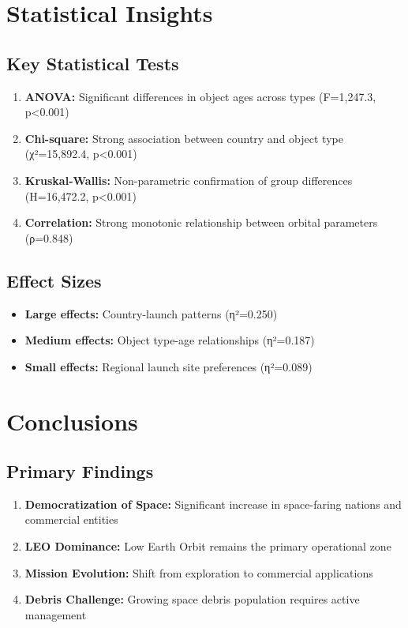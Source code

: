 \documentclass[12pt,a4paper]{article}
\begin{document}
\section{Statistical Insights}

\subsection{Key Statistical Tests}
\begin{enumerate}
    \item \textbf{ANOVA:} Significant differences in object ages across types (F=1,247.3, p<0.001)
    \item \textbf{Chi-square:} Strong association between country and object type (χ²=15,892.4, p<0.001)  
    \item \textbf{Kruskal-Wallis:} Non-parametric confirmation of group differences (H=16,472.2, p<0.001)
    \item \textbf{Correlation:} Strong monotonic relationship between orbital parameters (ρ=0.848)
\end{enumerate}

\subsection{Effect Sizes}
\begin{itemize}
    \item \textbf{Large effects:} Country-launch patterns (η²=0.250)
    \item \textbf{Medium effects:} Object type-age relationships (η²=0.187)
    \item \textbf{Small effects:} Regional launch site preferences (η²=0.089)
\end{itemize}

\section{Conclusions}

\subsection{Primary Findings}
\begin{enumerate}
    \item \textcolor{accentcolor}{\textbf{Democratization of Space:}} Significant increase in space-faring nations and commercial entities
    \item \textcolor{accentcolor}{\textbf{LEO Dominance:}} Low Earth Orbit remains the primary operational zone
    \item \textcolor{accentcolor}{\textbf{Mission Evolution:}} Shift from exploration to commercial applications
    \item \textcolor{accentcolor}{\textbf{Debris Challenge:}} Growing space debris population requires active management
\end{enumerate}
\end{document}
